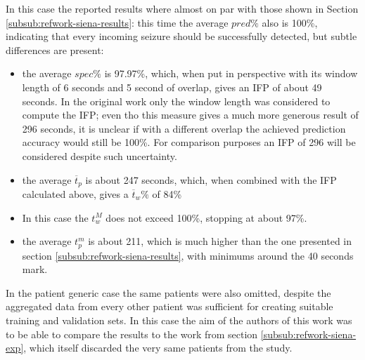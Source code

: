 In this case the reported results where almost on par with those shown in Section \ref{subsub:refwork-siena-results}: this time the average $pred\%$ also is 100\%, indicating that every incoming seizure should be successfully detected, but subtle differences are present:
\begin{itemize}
    \item the average $spec\%$ is 97.97\%, which, when put in perspective with its window length of 6 seconds and 5 second of overlap, gives an \gls{IFP} of about 49 seconds. In the original work only the window length was considered to compute the \gls{IFP}; even tho this measure gives a much more generous result of 296 seconds, it is unclear if with a different overlap the achieved prediction accuracy would still be 100\%.
    For comparison purposes an \gls{IFP} of 296 will be considered despite such uncertainty.
    \item the average $\overline{t}_p$ is about 247 seconds, which, when combined with the \gls{IFP} calculated above, gives a $\overline{t}_w\%$ of 84\%
    \item In this case the $t_w^M$ does not exceed 100\%, stopping at about 97\%.
    \item the average $t_p^m$ is about 211, which is much higher than the one presented in section \ref{subsub:refwork-siena-results}, with minimums around the 40 seconds mark.
\end{itemize}

In the patient generic case the same patients were also omitted, despite the aggregated data from every other patient was sufficient for creating suitable training and validation sets. In this case the aim of the authors of this work was to be able to compare the results to the work from section \ref{subsub:refwork-siena-exp}, which itself discarded the very same patients from the study.

